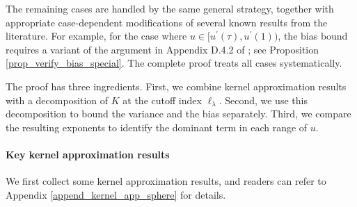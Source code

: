 \documentclass{article}
\theoremstyle{plain}
\theoremstyle{definition}
\theoremstyle{remark}
\begin{document}
\begin{appendix}
The remaining cases are handled by the same general strategy, together with appropriate case-dependent modifications of several known results from the literature.
For example, for the case where $u \in [u^{\prime}(\tau), u^{\prime}(1))$, the bias bound requires a variant of the argument in Appendix D.4.2 of \cite{lu2024saturation}; see Proposition \ref{prop_verify_bias_special}. 
The complete proof treats all cases systematically.





The proof has three ingredients. 
First, we combine kernel approximation results with a decomposition of $K$ at the cutoff index  $\ell_\lambda$. 
Second, we use this decomposition to bound the variance and the bias separately. 
Third, we compare the resulting exponents to identify the dominant term in each range of $u$. 




\paragraph*{Key kernel approximation results}
We first collect some kernel approximation results, and readers can refer to Appendix \ref{append_kernel_app_sphere} for details.


\end{appendix}
\end{document}
